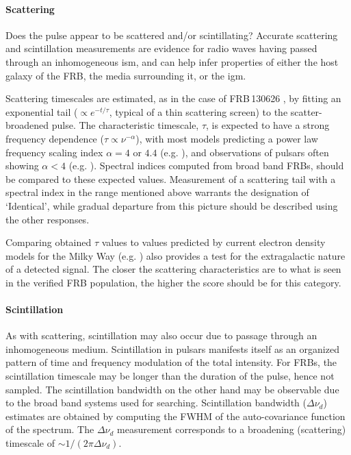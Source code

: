 \documentclass[a4paper,fleqn,usenatbib]{mnras}
\begin{document}
\paragraph{Scattering}

Does the pulse appear to be scattered and/or scintillating?  Accurate scattering
and scintillation measurements are evidence for radio waves having passed
through an inhomogeneous \gls{ism}, and can help infer properties of either the
host galaxy of the FRB,  the media surrounding it, or the \gls{igm}.

Scattering timescales are estimated, as in the case of FRB\,130626
\citep{2016MNRAS.460L..30C}, by fitting an exponential tail ($\propto
e^{-t/\tau}$, typical of a thin scattering screen) to the scatter-broadened
pulse. The characteristic timescale, $\tau$, is expected to have a strong
frequency dependence ($\tau \propto \nu^{-\alpha}$), with most models predicting
a power law frequency scaling index $\alpha =4$ or $4.4$ (e.g.
\citealt{Rickett1977}), and observations of pulsars often showing $\alpha < 4$
(e.g. \citealt{Lewandowski2015,Geyer2017}).  Spectral indices computed from
broad band FRBs, should be compared to these expected values.  Measurement of a
scattering tail with a spectral index in the range mentioned above warrants the
designation of `Identical', while gradual departure from this picture should be
described using the other responses. 

Comparing obtained $\tau$ values to values predicted by current
electron density models for the Milky Way (e.g.
\citealt{2002astro.ph..7156C,2017ApJ...835...29Y}) also provides a
test for the extragalactic nature of a detected signal. The closer the
scattering characteristics are to what is seen in the verified FRB
population, the higher the score should be for this category.

\paragraph{Scintillation}

As with scattering, scintillation may also occur due to passage through an
inhomogeneous medium. Scintillation in pulsars manifests itself as an organized
pattern of time and frequency modulation of the total intensity. For FRBs, the
scintillation timescale may be longer than the duration of the pulse, hence not
sampled. The scintillation bandwidth on the other hand may be observable due to
the broad band systems used for searching.  Scintillation bandwidth ($\Delta
\nu_d$) estimates are obtained by computing the FWHM of the auto-covariance
function of the spectrum.  The $\Delta \nu_d$ measurement corresponds to a
broadening (scattering) timescale of $\sim 1/(2\pi\Delta \nu_d)$.  
\end{document}
